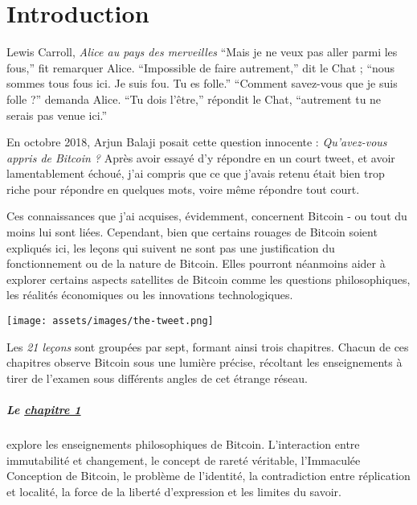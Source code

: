 \chapter*{Introduction}
\label{ch:introduction}

\begin{chapquote}{Lewis Carroll, \textit{Alice au pays des merveilles}}
\enquote{Mais je ne veux pas aller parmi les fous,} fit remarquer Alice.
\enquote{Impossible de faire autrement,} dit le Chat ; \enquote{nous sommes tous
fous ici. Je suis fou. Tu es folle.} \enquote{Comment savez-vous que je suis
folle ?} demanda Alice. \enquote{Tu dois l’être,} répondit le Chat,
\enquote{autrement tu ne serais pas venue ici.}
\end{chapquote}

En octobre 2018, Arjun Balaji posait cette question innocente :
\textit{Qu'avez-vous appris de Bitcoin ?} Après avoir essayé d'y répondre en un
court tweet, et avoir lamentablement échoué, j'ai compris que ce que j'avais
retenu était bien trop riche pour répondre en quelques mots, voire même répondre
tout court.

Ces connaissances que j'ai acquises, évidemment, concernent Bitcoin - ou tout du
moins lui sont liées. Cependant, bien que certains rouages de Bitcoin soient
expliqués ici, les leçons qui suivent ne sont pas une justification du
fonctionnement ou de la nature de Bitcoin. Elles pourront néanmoins aider à
explorer certains aspects satellites de Bitcoin comme les questions
philosophiques, les réalités économiques ou les innovations technologiques.

\begin{center}
  \texttt{[image: assets/images/the-tweet.png]}
\end{center}

Les \textit{21 leçons} sont groupées par sept, formant ainsi trois chapitres.
Chacun de ces chapitres observe Bitcoin sous une lumière précise, récoltant les
enseignements à tirer de l'examen sous différents angles de cet étrange réseau.

\paragraph{Le \hyperref[ch:philosophy]{chapitre 1}}{explore les enseignements
philosophiques de Bitcoin. L'interaction entre immutabilité et changement, le
concept de rareté véritable, l'Immaculée Conception de Bitcoin, le problème de
l'identité, la contradiction entre réplication et localité, la force de la
liberté d'expression et les limites du savoir.}

